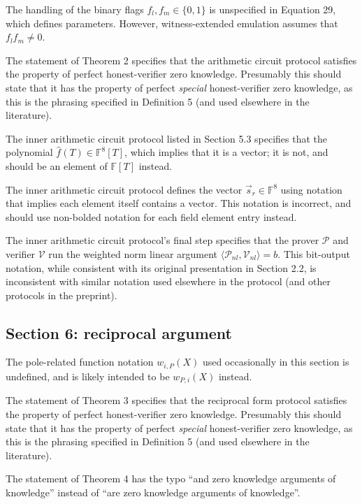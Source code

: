\documentclass{article}
\begin{document}
The handling of the binary flags $f_l, f_m \in \{ 0, 1 \}$ is unspecified in Equation 29, which defines parameters.
However, witness-extended emulation assumes that $f_l f_m \neq 0$.

The statement of Theorem 2 specifies that the arithmetic circuit protocol satisfies the property of perfect honest-verifier zero knowledge.
Presumably this should state that it has the property of perfect \textit{special} honest-verifier zero knowledge, as this is the phrasing specified in Definition 5 (and used elsewhere in the literature).

The inner arithmetic circuit protocol listed in Section 5.3 specifies that the polynomial $\hat{f}(T) \in \mathbb{F}^8[T]$, which implies that it is a vector; it is not, and should be an element of $\mathbb{F}[T]$ instead.

The inner arithmetic circuit protocol defines the vector $\vec{s}_r \in \mathbb{F}^8$ using notation that implies each element itself contains a vector.
This notation is incorrect, and should use non-bolded notation for each field element entry instead.

The inner arithmetic circuit protocol's final step specifies that the prover $\mathcal{P}$ and verifier $\mathcal{V}$ run the weighted norm linear argument $\langle \mathcal{P}_{nl}, \mathcal{V}_{nl} \rangle = b$. This bit-output notation, while consistent with its original presentation in Section 2.2, is inconsistent with similar notation used elsewhere in the protocol (and other protocols in the preprint).


\subsection{Section 6: reciprocal argument}

The pole-related function notation $w_{i,P}(X)$ used occasionally in this section is undefined, and is likely intended to be $w_{P,i}(X)$ instead.

The statement of Theorem 3 specifies that the reciprocal form protocol satisfies the property of perfect honest-verifier zero knowledge.
Presumably this should state that it has the property of perfect \textit{special} honest-verifier zero knowledge, as this is the phrasing specified in Definition 5 (and used elsewhere in the literature).

The statement of Theorem 4 has the typo ``and zero knowledge arguments of knowledge'' instead of ``are zero knowledge arguments of knowledge''.
\end{document}
